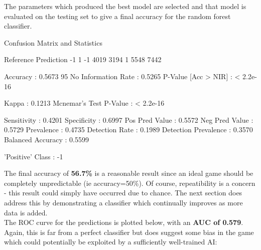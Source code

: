 \documentclass[10pt]{article}
\begin{document}
The parameters which produced the best model are selected and that model is evaluated on the testing set to give a final accuracy for the random forest classifier.
\begin{Schunk}
\begin{Soutput}
Confusion Matrix and Statistics

          Reference
Prediction   -1    1
        -1 4019 3194
        1  5548 7442
                                          
               Accuracy : 0.5673          
                 95%
    No Information Rate : 0.5265          
    P-Value [Acc > NIR] : < 2.2e-16       
                                          
                  Kappa : 0.1213          
 Mcnemar's Test P-Value : < 2.2e-16       
                                          
            Sensitivity : 0.4201          
            Specificity : 0.6997          
         Pos Pred Value : 0.5572          
         Neg Pred Value : 0.5729          
             Prevalence : 0.4735          
         Detection Rate : 0.1989          
   Detection Prevalence : 0.3570          
      Balanced Accuracy : 0.5599          
                                          
       'Positive' Class : -1              
\end{Soutput}
\end{Schunk}

The final accuracy of \textbf{56.7\%} is a reasonable result since an ideal game should be completely unpredictable (ie accuracy=50\%). Of course, repeatibility is a concern - this result could simply have occurred due to chance. The next section does address this by demonstrating a classifier which continually improves as more data is added.\\

The ROC curve for the predictions is plotted below, with an \textbf{AUC of 0.579}. Again, this is far from a perfect classifier but does suggest some bias in the game which could potentially be exploited by a sufficiently well-trained AI:
\end{document}
